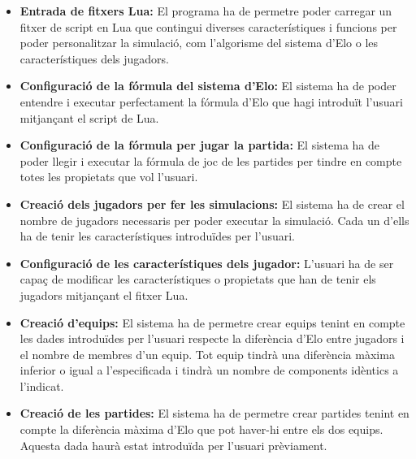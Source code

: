 \documentclass[a4paper]{article}
\begin{document}
\begin{itemize}
    \item \textbf{Entrada de fitxers Lua:} El programa ha de permetre poder carregar un fitxer de script en Lua que contingui diverses característiques i funcions per poder personalitzar la simulació, com l'algorisme del sistema d'Elo o les característiques dels jugadors.
    
    \item \textbf{Configuració de la fórmula del sistema d'Elo:} El sistema ha de poder entendre i executar perfectament la fórmula d'Elo que hagi introduït l'usuari mitjançant el script de Lua. 
    
    \item \textbf{Configuració de la fórmula per jugar la partida:} El sistema ha de poder llegir i executar la fórmula de joc de les partides per tindre en compte totes les propietats que vol l'usuari.
    
    \item \textbf{Creació dels jugadors per fer les simulacions:} El sistema ha de crear el nombre de jugadors necessaris per poder executar la simulació. Cada un d'ells ha de tenir les característiques introduïdes per l'usuari.
    
    \item \textbf{Configuració de les característiques dels jugador:} L'usuari ha de ser capaç de modificar les característiques o propietats que han de tenir els jugadors mitjançant el fitxer Lua.
    
    \item \textbf{Creació d'equips:} El sistema ha de permetre crear equips tenint en compte les dades introduïdes per l'usuari respecte la diferència d'Elo entre jugadors i el nombre de membres d'un equip. Tot equip tindrà una diferència màxima inferior o igual a l'especificada i tindrà un nombre de components idèntics a l'indicat.
    
    \item \textbf{Creació de les partides:} El sistema ha de permetre crear partides tenint en compte la diferència màxima d'Elo que pot haver-hi entre els dos equips. Aquesta dada haurà estat introduïda per l'usuari prèviament.
    

    

\end{itemize}
\end{document}
